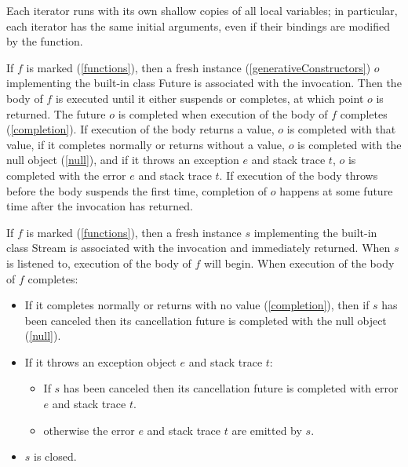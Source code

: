 \documentclass{article}
\newcommand{\code}[1]{{\sf #1}}
\begin{document}
\LMHash{}
Each iterator runs with its own shallow copies of all local variables; in particular, each iterator has the same initial arguments, even if their bindings are modified by the function.

\LMHash{}
If $f$ is marked \ASYNC{} (\ref{functions}), then a fresh instance (\ref{generativeConstructors}) $o$ implementing the built-in class \code{Future} is associated with the invocation.
Then the body of $f$ is executed until it either suspends or completes, at which point $o$ is returned.
The future $o$ is completed when execution of the body of $f$ completes (\ref{completion}).
If execution of the body returns a value, $o$ is completed with that value,
if it completes normally or returns without a value,
$o$ is completed with the null object (\ref{null}),
and if it throws an exception $e$ and stack trace $t$,
$o$ is completed with the error $e$ and stack trace $t$.
If execution of the body throws before the body suspends the first time,
completion of $o$ happens at some future time after the invocation has returned.

\LMHash{}
If $f$ is marked \ASYNC* (\ref{functions}), then a fresh instance $s$ implementing the built-in class \code{Stream} is associated with the invocation and immediately returned. When $s$ is listened to, execution of the body of $f$ will begin.
When execution of the body of $f$ completes:
\begin{itemize}
\item If it completes normally or returns with no value (\ref{completion}), then if $s$ has been canceled then its cancellation future is completed with the null object (\ref{null}).
\item If it throws an exception object $e$ and stack trace $t$:
  \begin{itemize}
  \item If $s$ has been canceled then its cancellation future is completed with error $e$ and stack trace $t$.
  \item otherwise the error $e$ and stack trace $t$ are emitted by $s$.
  \end{itemize}
\item $s$ is closed.
\end{itemize}
\end{document}
